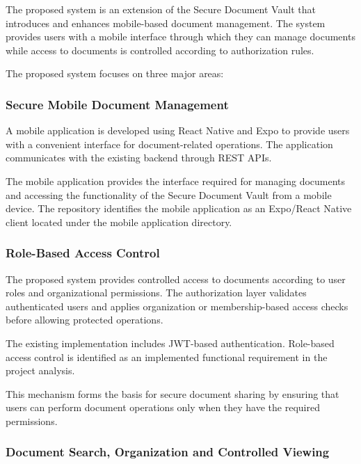 \documentclass[12pt]{article}
\begin{document}
The proposed system is an extension of the Secure Document Vault that introduces and enhances mobile-based document management. The system provides users with a mobile interface through which they can manage documents while access to documents is controlled according to authorization rules.

The proposed system focuses on three major areas:


\subsubsection{Secure Mobile Document Management}

A mobile application is developed using React Native and Expo to provide users with a convenient interface for document-related operations. The application communicates with the existing backend through REST APIs.

The mobile application provides the interface required for managing documents and accessing the functionality of the Secure Document Vault from a mobile device. The repository identifies the mobile application as an Expo/React Native client located under the mobile application directory.


\subsubsection{Role-Based Access Control}

The proposed system provides controlled access to documents according to user roles and organizational permissions. The authorization layer validates authenticated users and applies organization or membership-based access checks before allowing protected operations.

The existing implementation includes JWT-based authentication. Role-based access control is identified as an implemented functional requirement in the project analysis.

This mechanism forms the basis for secure document sharing by ensuring that users can perform document operations only when they have the required permissions.


\subsubsection{Document Search, Organization and Controlled Viewing}
\end{document}
